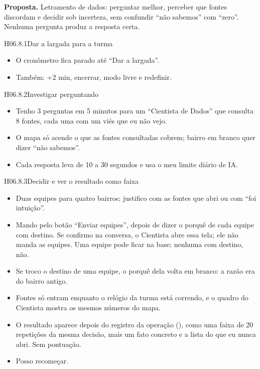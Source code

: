 \textbf{Proposta.} Letramento de dados: perguntar melhor, perceber que fontes
discordam e decidir sob incerteza, sem confundir \enquote{não sabemos} com
\enquote{zero}. Nenhuma pergunta produz a resposta certa.

\begin{historia}{H06.8.1}{Dar a largada para a turma}{\pronto}
\aceite
\begin{itemize}
  \item O cronômetro fica parado até \enquote{Dar a largada}.
  \item Também: +2 min, encerrar, modo livre e redefinir.
\end{itemize}
\end{historia}

\begin{historia}{H06.8.2}{Investigar perguntando}{\pronto}
\aceite
\begin{itemize}
  \item Tenho 3 perguntas em 5 minutos para um \enquote{Cientista de Dados} que
    consulta 8 fontes, cada uma com um viés que eu não vejo.
  \item O mapa só acende o que as fontes consultadas cobrem; bairro em branco
    quer dizer \enquote{não sabemos}.
  \item Cada resposta leva de 10 a 30 segundos e usa o meu limite diário de
    IA.
\end{itemize}
\end{historia}

\begin{historia}{H06.8.3}{Decidir e ver o resultado como faixa}{\pronto}
\aceite
\begin{itemize}
  \item Duas equipes para quatro bairros; justifico com as fontes que abri ou
    com \enquote{foi intuição}.
  \item Mando pelo botão \enquote{Enviar equipes}, depois de dizer o porquê
    de cada equipe com destino. Se confirmo na conversa, o Cientista abre essa
    tela; ele não manda as equipes. Uma equipe pode ficar na base; nenhuma com
    destino, não.
  \item Se troco o destino de uma equipe, o porquê dela volta em branco: a
    razão era do bairro antigo.
  \item Fontes só entram enquanto o relógio da turma está correndo, e o quadro
    do Cientista mostra os mesmos números do mapa.
  \item O resultado aparece depois do registro da operação (),
    como uma faixa de 20 repetições da mesma decisão, mais um fato concreto e
    a lista do que eu nunca abri. Sem pontuação.
  \item Posso recomeçar.
\end{itemize}
\end{historia}

